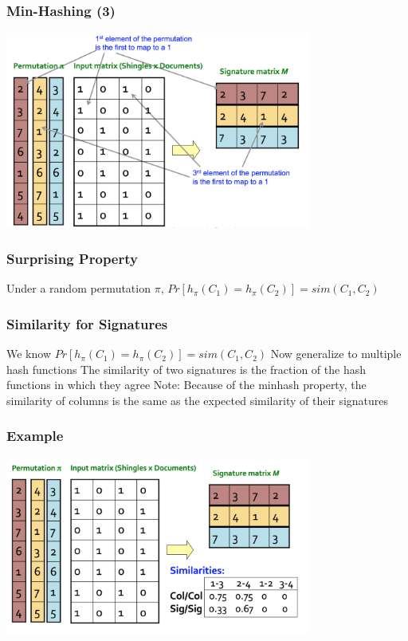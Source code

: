 \documentclass[svgnames]{beamer}
\begin{document}
  
\begin{frame} \frametitle{Min-Hashing (3)}

\includegraphics[width=10cm]{minhash}

\end{frame}

  
\begin{frame} \frametitle{Surprising Property}

Under a random permutation $\pi$, $Pr[h_\pi(C_1) = h_\pi(C_2)] = sim(C_1, C_2)$

\end{frame}

  
\begin{frame} \frametitle{Similarity for Signatures}

We know $Pr[h_\pi(C_1) = h_\pi(C_2)] = sim(C_1, C_2)$
Now generalize to multiple hash functions
The similarity of two signatures is the fraction of the hash functions in which they agree
Note: Because of the minhash property, the similarity of columns is the same as the expected similarity of their signatures

\end{frame}

  
\begin{frame} \frametitle{Example}

\includegraphics[width=10cm]{example}

\end{frame}
\end{document}
